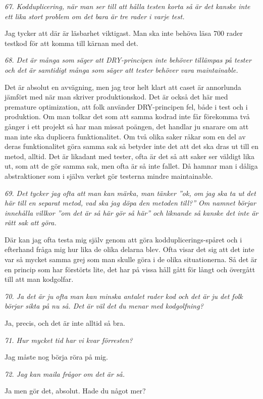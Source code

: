 \documentclass[11pt]{article}
\begin{document}
\emph{67. Kodduplicering, när man ser till att hålla testen korta så är det kanske inte ett lika stort problem om det bara är tre rader i varje test.}

Jag tycker att där är läsbarhet viktigast. Man ska inte behöva läsa 700 rader testkod för att komma till kärnan med det.

\emph{68. Det är många som säger att DRY-principen inte behöver tillämpas på tester och det är samtidigt många som säger att tester behöver vara maintainable.}

Det är absolut en avvägning, men jag tror helt klart att caset är annorlunda jämfört med när man skriver produktionskod. Det är också det här med premature optimization, att folk använder DRY-principen fel, både i test och i produktion. Om man tolkar det som att samma kodrad inte får förekomma två gånger i ett projekt så har man missat poängen, det handlar ju snarare om att man inte ska duplicera funktionalitet. Om två olika saker råkar som en del av deras funktionalitet göra samma sak så betyder inte det att det ska dras ut till en metod, alltid. Det är likadant med tester, ofta är det så att saker ser väldigt lika ut, som att de gör samma sak, men ofta är så inte fallet. Då hamnar man i dåliga abstraktioner som i själva verket gör testerna mindre maintainable.

\emph{69. Det tycker jag ofta att man kan märka, man tänker ”ok, om jag ska ta ut det här till en separat metod, vad ska jag döpa den metoden till?” Om namnet börjar innehålla villkor ”om det är så här gör så här” och liknande så kanske det inte är rätt sak att göra.}

Där kan jag ofta testa mig själv genom att göra kodduplicerings-spåret och i efterhand fråga mig hur lika de olika delarna blev. Ofta visar det sig att det inte var så mycket samma grej som man skulle göra i de olika situationerna. Så det är en princip som har förstörts lite, det har på vissa håll gått för långt och övergått till att man kodgolfar.

\emph{70. Ja det är ju ofta man kan minska antalet rader kod och det är ju det folk börjar sikta på nu så. Det är väl det du menar med kodgolfning?}

Ja, precis, och det är inte alltid så bra.

\emph{71. Hur mycket tid har vi kvar förresten?}

Jag måste nog börja röra på mig.

\emph{72. Jag kan maila frågor om det är så.}

Ja men gör det, absolut. Hade du något mer?
\end{document}
